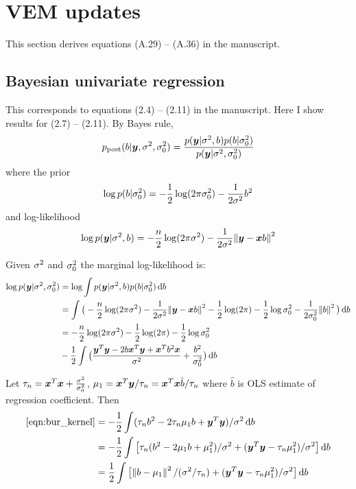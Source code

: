 \section{\susie VEM updates}

This section derives equations (A.29) -- (A.36) in the manuscript. 

\subsection{Bayesian univariate regression} \label{sec:bur}

This corresponds to equations (2.4) -- (2.11) in the manuscript. Here I show results for (2.7) -- (2.11). By Bayes rule,
\begin{equation}
    p_\text{post}(b|\bm y, \sigma^2, \sigma^2_0) = \frac{p(\bm y|\sigma^2,b)p(b|\sigma^2_0)}{p(\bm y|\sigma^2, \sigma^2_0)}
\end{equation}
where the prior
\begin{equation}
    \log p(b|\sigma^2_0) = -\frac{1}{2}\log (2\pi\sigma^2_0) - \frac{1}{2\sigma^2}b^2
\end{equation}
and log-likelihood
\begin{equation}
\log p(\bm y|\sigma^2, b) = -\frac{n}{2}\log(2\pi\sigma^2) - \frac{1}{2\sigma^2}\norm{\bm y - \bm x b}^2
\end{equation}

Given $\sigma^2$ and $\sigma^2_0$ the marginal log-likelihood is:
\begin{align}
    \log p(\vy|\rv, \rv_0) &= \log \int p(\vy|\rv, b) p(b|\rv_0)\dif b \label{eqn:bur_marginal}\\
    & = \int \big(-\frac{n}{2} \log(2\pi\rv) - \frac{1}{2\rv}\norm{\vy-\vx b}^2 - \frac{1}{2}\log(2\pi) - \frac{1}{2}\log\rv_0 - \frac{1}{2\rv_0}\norm{b}^2\big)\dif b \\
    & = -\frac{n}{2}\log (2\pi\rv) - \frac{1}{2}\log(2\pi) - \frac{1}{2}\log \rv_0 \\
    & -\frac{1}{2} \int \big( \frac{\vy^T\vy - 2b\vx^T\vy + \vx^T b^2\vx}{\rv} + \frac{b^2}{\rv_0}\big) \dif b \label{eqn:bur_kernel}
\end{align}

Let $\tau_n = \bm x^T\bm x + \frac{\sigma^2}{\sigma^2_0}$, $\mu_1 = \bm x^T\bm y / \tau_n = \bm x^T\bm x \hat{b} / \tau_n$ where $\hat{b}$ is OLS estimate of regression coefficient. Then
\begin{align}
    \eqref{eqn:bur_kernel} &= -\frac{1}{2}\int (\tau_nb^2 - 2\tau_n \mu_1 b + \vy^T\vy) / \rv \dif b \\ 
    &= -\frac{1}{2}\int \big[ \tau_n(b^2 - 2\mu_1 b + \mu_1^2) / \rv + (\vy^T\vy - \tau_n\mu_1^2) / \rv \big] \dif b \\ 
    &= \frac{1}{2} \int \big[\norm{b-\mu_1}^2 / (\rv/\tau_n) + (\vy^T\vy - \tau_n\mu_1^2) / \rv \big] \dif b
\end{align}

